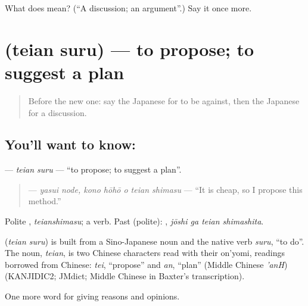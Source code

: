 \begin{tcolorbox}[breakable,colback=teal!4,colframe=teal!35!black,title={Before you move on}]
What does  mean? (\textquotedblleft{}A discussion; an argument\textquotedblright{}.) Say it once more.
\end{tcolorbox}
\section[\texorpdfstring{\ja{ていあんする} (teian suru)}{ていあんする (teian suru)}]{ (teian suru) — to propose; to suggest a plan}

\label{lesson:JA-C317-teian-suru}



\begin{quote}
Before the new one: say the Japanese for to be against, then the Japanese for a discussion.
\end{quote}

\subsection*{You'll want to know: }
\textbf{} — \emph{teian suru} — \textquotedblleft{}to propose; to suggest a plan\textquotedblright{}.

\begin{quote}
\textbf{  } — \emph{yasui node, kono hōhō o teian shimasu} — \textquotedblleft{}It is cheap, so I propose this method.\textquotedblright{}
\end{quote}

Polite \textbf{}, \emph{teianshimasu}; a  verb. Past (polite): \textbf{ }, \emph{jōshi ga teian shimashita}.

\begin{cousinweb}
\textbf{} (\emph{teian suru}) is built from a Sino-Japanese noun and the native verb \emph{suru}, \textquotedblleft{}to do\textquotedblright{}. The noun, \emph{teian}, is two Chinese characters read with their on'yomi, readings borrowed from Chinese: \emph{tei}, \textquotedblleft{}propose\textquotedblright{} and \emph{an}, \textquotedblleft{}plan\textquotedblright{} (Middle Chinese \emph{'anH}) (KANJIDIC2; JMdict; Middle Chinese in Baxter's transcription).
\end{cousinweb}

\begin{grammarlens}[title={What you've built}]
One more word for giving reasons and opinions.
\end{grammarlens}

